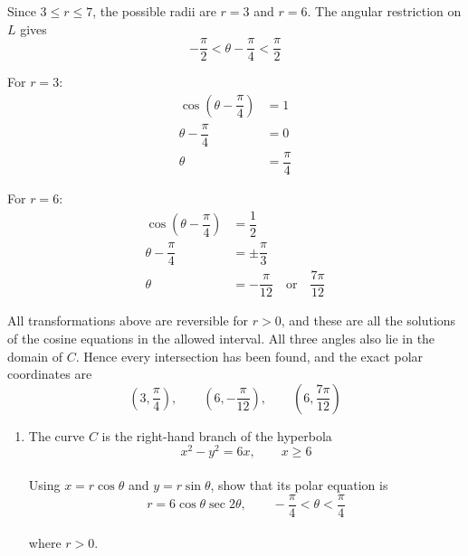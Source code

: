\documentclass[leqno]{article}
\begin{document}
\begin{enumerate}[
  label=\textbf{\arabic*.},
  leftmargin=*,
  topsep=0pt,
  partopsep=0pt,
  parsep=0pt
]
\begin{djsSolution}
\begin{enumerate}[label=\textbf{(\alph*)}, start=1]
Since \(3\leq r\leq7\), the possible radii are \(r=3\) and \(r=6\).
The angular restriction on \(L\) gives
\[
-\dfrac{\pi}{2}<\theta-\dfrac{\pi}{4}<\dfrac{\pi}{2}
\]

For \(r=3\):
\begin{align*}
\cos\left(\theta-\dfrac{\pi}{4}\right)&=1\\
\theta-\dfrac{\pi}{4}&=0\\
\theta&=\dfrac{\pi}{4}
\end{align*}

For \(r=6\):
\begin{align*}
\cos\left(\theta-\dfrac{\pi}{4}\right)&=\dfrac12\\
\theta-\dfrac{\pi}{4}&=\pm\dfrac{\pi}{3}\\
\theta&=-\dfrac{\pi}{12}\quad\text{or}\quad\dfrac{7\pi}{12}
\end{align*}

All transformations above are reversible for \(r>0\), and these are all the solutions of the cosine equations in the allowed interval. All three angles also lie in the domain of \(C\). Hence every intersection has been found, and the exact polar coordinates are
\[
\left(3,\dfrac{\pi}{4}\right),\qquad
\left(6,-\dfrac{\pi}{12}\right),\qquad
\left(6,\dfrac{7\pi}{12}\right)
\]

\end{enumerate}
\end{djsSolution}

\newpage

\questionitem

\begin{enumerate}[label=\textbf{(\alph*)}]
\item The curve $C$ is the right-hand branch of the hyperbola
\[
x^2-y^2=6x,\qquad x\geq6
\] \\
Using $x=r\cos\theta$ and $y=r\sin\theta$, show that its polar equation is
\[
r=6\cos\theta\sec 2\theta,\qquad -\frac{\pi}{4}<\theta<\frac{\pi}{4}
\] \\
where $r>0$.  \\

\begin{figure}[H]
    \centering
{}
\end{figure}



\end{enumerate}
\end{enumerate}
\end{document}
